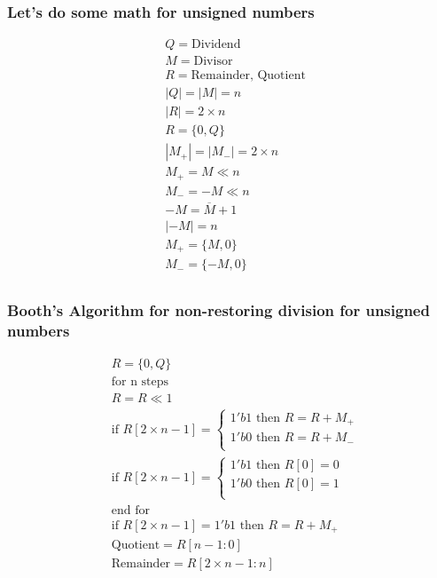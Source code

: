 \begin{frame}
    \frametitle{Let's do some math for unsigned numbers}
    \begin{equation}
        \begin{aligned}
            &Q = \text{Dividend}\\
            &M = \text{Divisor}\\
            &R = \text{Remainder, Quotient}\\
            &|Q|=|M|=n\\
            &|R|=2 \times n\\
            &R=\{0,Q\}\\
            &|M_{+}|=|M_{-}|=2 \times n\\
            &M_{+}=M \ll n\\
            &M_{-}=-M \ll n\\
            &-M=\overline{M}+1\\
            &|-M|=n\\
            &M_{+}=\{M, 0\}\\
            &M_{-}=\{-M, 0\}\\
        \end{aligned}
    \end{equation}
\end{frame}

\begin{frame}
    \frametitle{Booth's Algorithm for non-restoring division for unsigned numbers}
    \begin{equation}
        \begin{aligned}
            &R=\{0,Q\}\\
            &\text{for n steps}\\
            &R=R \ll 1\\
            &\text{if } R[2 \times n - 1]=\begin{cases}
                1'b1 \text{ then } R=R+M_{+}\\
                1'b0 \text{ then } R=R+M_{-}\\
            \end{cases}\\
            &\text{if } R[2 \times n - 1]=\begin{cases}
                1'b1 \text{ then } R[0]=0\\
                1'b0 \text{ then } R[0]=1\\
            \end{cases}\\
            &\text{end for}\\
            &\text{if } R[2 \times n - 1]=1'b1 \text{ then } R=R+M_{+}\\
            &\text{Quotient}=R[n-1:0]\\
            &\text{Remainder}=R[2 \times n -1 : n]
        \end{aligned}
    \end{equation}
\end{frame}
